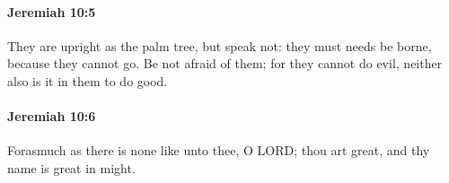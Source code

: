 		\paragraph{Jeremiah 10:5} %
			\label{JEREMIAH-10-5}

			They are upright as the palm tree, but speak not: they must needs be borne, because they cannot go. Be not afraid of them; for they cannot do evil, neither also is it in them to do good.


		\paragraph{Jeremiah 10:6} %
			\label{JEREMIAH-10-6}

			Forasmuch as there is none like unto thee, O LORD; thou art great, and thy name is great in might.



